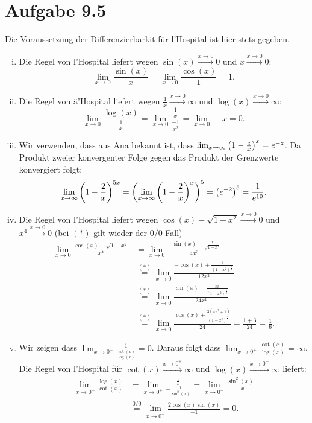 \documentclass{theozettel}
\begin{document}
\section*{Aufgabe 9.5} 
Die Voraussetzung der Differenzierbarkit für l'Hospital ist hier stets gegeben.
\begin{enumerate}[(i)]
	\item 	Die Regel von l'Hospital liefert wegen $\sin(x) \stackrel{x \to 0}{\longrightarrow} 0$ und $x \stackrel{x \to 0}{\longrightarrow} 0$:
			\[
				\lim_{x \to 0} \frac{\sin(x)}{x} = \lim_{x \to 0} \frac{\cos(x)}{1} = 1.
			\]
			
	\item 	Die Regel von ä'Hospital liefert wegen $\frac{1}{x} \stackrel{x \to 0}{\longrightarrow} \infty$ und $\log(x) \stackrel{x \to 0}{\longrightarrow} \infty$:
			\[
				\lim_{x \to 0} \frac{\log(x)}{\frac{1}{x}} = \lim_{x \to 0} \frac{\frac{1}{x} }{ \frac{-1}{x^{2}}} = \lim_{x \to 0} -x = 0.
			\]
	
	\item 	Wir verwenden, dass aus Ana bekannt ist, dass $\lim_{x \to \infty} \qty(1 - \frac{z}{x})^{x} = e^{-z}$. Da Produkt zweier konvergenter Folge gegen das Produkt der Grenzwerte konvergiert folgt:
			\[
				\lim_{x \to \infty} \qty(1-\frac{2}{x})^{5x} = \left( \lim_{x \to \infty} \qty(1-\frac{2}{x})^{x} \right)^{5} = \qty(e^{-2})^{5} =\frac{1}{e^{10}}.
			\]
	
	\item 	Die Regel von l'Hospital liefert wegen $\cos(x) - \sqrt{1-x^{2}} \stackrel{x \to 0}{\longrightarrow} 0$ und $x^{4} \stackrel{x \to 0}{\longrightarrow} 0$ (bei $(*)$ gilt wieder der $0/0$ Fall)
			\begin{align*}
				\lim_{x \to 0} \frac{\cos(x) - \sqrt{1-x^{2}}}{x^{4}} &= \lim_{x \to 0} \frac{-\sin(x) - \frac{x}{\sqrt{1-x^{2}}}}{4x^{3}} \\
				&\stackrel{(*)}{=} \lim_{x \to 0} \frac{-\cos(x) + \frac{1}{(1-x^{2})^{\frac{3}{2}}}}{12x^{2}}  \\
				&\stackrel{(*)}{=} \lim_{x \to 0} \frac{\sin(x) + \frac{3x}{(1-x^{2})^{\frac{5}{2}}}}{24x^{1}} \\
				&\stackrel{(*)}{=} \lim_{x \to 0} \frac{\cos(x) + \frac{3(4x^2 + 1)}{(1-x^{2})^{\frac{7}{2}}}}{24} = \frac{1 + 3}{24} = \frac{1}{6}.			
			\end{align*}
	
	\item 	Wir zeigen dass $\lim_{x \to 0^{+}} \frac{1}{\frac{\cot(x)}{\log(x)}} = 0$. Daraus folgt dass $\lim_{x \to 0^{+}} \frac{\cot(x)}{\log(x)} = \infty$. Die Regel von l'Hospital für $\cot(x) \stackrel{x \to 0^{+}}{\longrightarrow} \infty$ und $\log(x)\stackrel{x \to 0^{+}}{\longrightarrow} \infty$ liefert:
			\begin{align*}
				\lim_{x \to 0^{+}} \frac{\log(x)}{\cot(x)} &= \lim_{x \to 0^{+}} \frac{\frac{1}{x}}{-\frac{1}{\sin^{2}(x)}}  = \lim_{x \to 0^{+}} \frac{\sin^{2}(x)}{-x} \\
				&\stackrel{0/0}{=} \lim_{x \to 0^{+}} \frac{2\cos(x)\sin(x)}{-1} = 0.
			\end{align*}
	

\end{enumerate}
\end{document}
